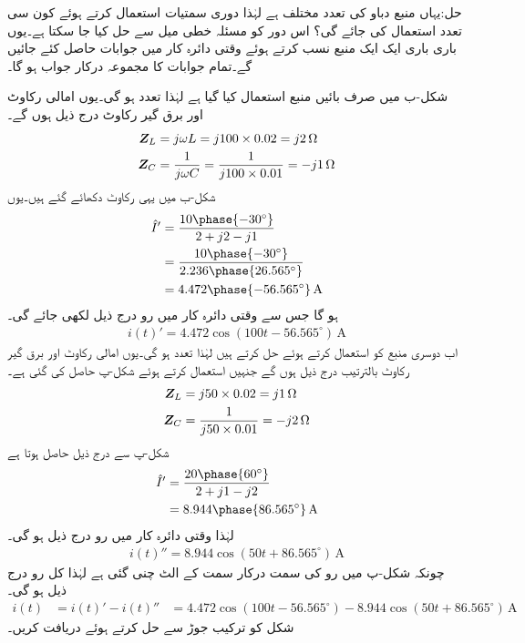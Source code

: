 حل:یہاں منبع دباو کی تعدد مختلف ہے لہٰذا دوری سمتیات استعمال کرتے ہوئے کون سی تعدد استعمال کی جائے گی؟ اس دور کو مسئلہ خطی میل سے حل کیا جا سکتا ہے۔یوں باری باری ایک ایک منبع نسب کرتے ہوئے وقتی دائرہ کار میں جوابات حاصل کئے جائیں گے۔تمام جوابات کا مجموعہ درکار جواب ہو گا۔

شکل-ب میں صرف بائیں منبع استعمال کیا گیا ہے لہٰذا تعدد  ہو گی۔یوں امالی رکاوٹ اور برق گیر رکاوٹ درج ذیل ہوں گے۔
\begin{align*}
{\ensuremath{{\boldsymbol{Z}}}}_L&=j\omega L=j 100\times 0.02=j2 \,\si{\ohm}\\
{{\boldsymbol{Z}}}_C&=\frac{1}{j \omega C}=\frac{1}{j 100 \times 0.01}=-j1 \,\si{\ohm}
\end{align*}
شکل-ب میں یہی رکاوٹ دکھائے گئے ہیں۔یوں
\begin{align*}
\hat{I}'&=\frac{10\phase{-30^{\circ}}}{2+j2-j1}\\
&=\frac{10\phase{-30^{\circ}}}{2.236\phase{26.565^{\circ}}}\\
&=4.472\phase{-56.565^{\circ}}\,\si{\ampere}
\end{align*}
ہو گا جس سے وقتی دائرہ کار میں رو درج ذیل لکھی جائے گی۔
\begin{align*}
i(t)'=4.472\cos(100t-56.565^{\circ})\,\si{\ampere}
\end{align*}
اب دوسری منبع کو استعمال کرتے ہوئے حل کرتے ہیں لہٰذا تعدد  ہو گی۔یوں امالی رکاوٹ اور برق گیر رکاوٹ بالترتیب درج ذیل ہوں گے جنہیں استعمال کرتے ہوئے شکل-پ حاصل کی گئی ہے۔
\begin{align*}
{\ensuremath{{\boldsymbol{Z}}}}_L&=j50\times 0.02=j1 \,\si{\ohm}\\
{{\boldsymbol{Z}}}_C&=\frac{1}{j50\times 0.01}=-j2\,\si{\ohm}
\end{align*}
شکل-پ سے درج ذیل حاصل ہوتا ہے
\begin{align*}
\hat{I}'&=\frac{20\phase{60^{\circ}}}{2+j1-j2}\\
&=8.944\phase{86.565^{\circ}}\,\si{\ampere}
\end{align*}
لہٰذا وقتی دائرہ کار میں رو درج ذیل ہو گی۔
\begin{align*}
i(t)''=8.944\cos(50t+86.565^{\circ})\,\si{\ampere}
\end{align*}
چونکہ شکل-پ میں رو کی سمت درکار سمت کے الٹ چنی گئی ہے لہٰذا کل رو درج ذیل ہو گی۔
\begin{align*}
i(t)&=i(t)'-i(t)''
&=4.472\cos(100t-56.565^{\circ})-8.944\cos(50t+86.565^{\circ})\, \si{\ampere}
\end{align*}
شکل  کو ترکیب جوڑ سے حل کرتے ہوئے  دریافت کریں۔


